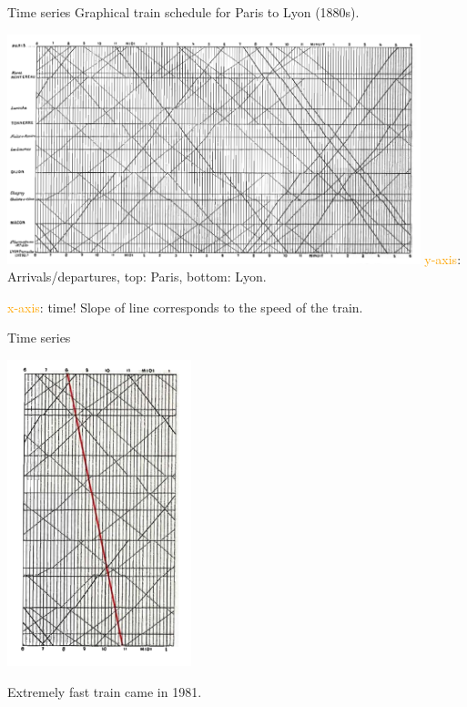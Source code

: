 \documentclass[
  ignorenonframetext,
]{beamer}
\begin{document}
\begin{frame}{Time series}
\protect\hypertarget{time-series-3}{}
Graphical train schedule for Paris to Lyon (1880s).

\includegraphics[width=0.9\textwidth,height=\textheight]{excellence_figs/fig_16.png}
\textcolor{orange}{y-axis}: Arrivals/departures, top: Paris, bottom:
Lyon.

\textcolor{orange}{x-axis}: time! Slope of line corresponds to the speed
of the train.
\end{frame}

\begin{frame}{Time series}
\protect\hypertarget{time-series-4}{}
\centering

\includegraphics[width=0.4\textwidth]{excellence_figs/fig_17.png}

Extremely fast train came in 1981.
\end{frame}
\end{document}
